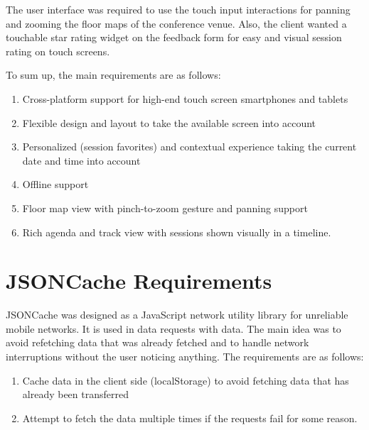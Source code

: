 The user interface was required to use the touch input interactions
for panning and zooming the floor maps of the conference venue. Also,
the client wanted a touchable star rating widget on the feedback form
for easy and visual session rating on touch screens.

To sum up, the main requirements are as follows:

\begin{enumerate}
\item Cross-platform support for high-end touch screen smartphones and
  tablets
\item Flexible design and layout to take the available screen into
  account
\item Personalized (session favorites) and contextual experience
  taking the current date and time into account
\item Offline support
\item Floor map view with pinch-to-zoom gesture and panning support
\item Rich agenda and track view with sessions shown visually in a
  timeline.
\end{enumerate}

\section{JSONCache Requirements}
\label{section:jsoncache-requirements}

JSONCache was designed as a JavaScript network utility library for
unreliable mobile networks. It is used in  data requests
with  data. The main idea was to avoid refetching data that
was already fetched and to handle network interruptions without the
user noticing anything. The requirements are as follows:
\begin{enumerate}[resume]
\item Cache data in the client side (localStorage) to avoid fetching
  data that has already been transferred
\item Attempt to fetch the data multiple times if the requests fail
  for some reason.
\end{enumerate}
